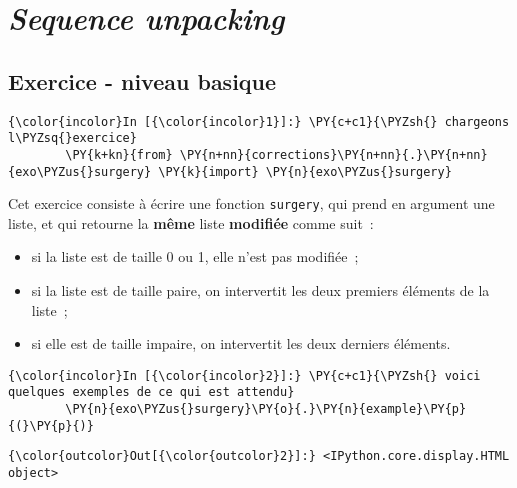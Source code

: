     
    
    
    

    

    \hypertarget{sequence-unpacking}{%
\section{\texorpdfstring{\emph{Sequence
unpacking}}{Sequence unpacking}}\label{sequence-unpacking}}

    \hypertarget{exercice---niveau-basique}{%
\subsection{Exercice - niveau basique}\label{exercice---niveau-basique}}

    \begin{Verbatim}[commandchars=\\\{\}]
{\color{incolor}In [{\color{incolor}1}]:} \PY{c+c1}{\PYZsh{} chargeons l\PYZsq{}exercice}
        \PY{k+kn}{from} \PY{n+nn}{corrections}\PY{n+nn}{.}\PY{n+nn}{exo\PYZus{}surgery} \PY{k}{import} \PY{n}{exo\PYZus{}surgery}
\end{Verbatim}


    Cet exercice consiste à écrire une fonction \texttt{surgery}, qui prend
en argument une liste, et qui retourne la \textbf{même} liste
\textbf{modifiée} comme suit~:

\begin{itemize}
\tightlist
\item
  si la liste est de taille 0 ou 1, elle n'est pas modifiée~;
\item
  si la liste est de taille paire, on intervertit les deux premiers
  éléments de la liste~;
\item
  si elle est de taille impaire, on intervertit les deux derniers
  éléments.
\end{itemize}

    \begin{Verbatim}[commandchars=\\\{\}]
{\color{incolor}In [{\color{incolor}2}]:} \PY{c+c1}{\PYZsh{} voici quelques exemples de ce qui est attendu}
        \PY{n}{exo\PYZus{}surgery}\PY{o}{.}\PY{n}{example}\PY{p}{(}\PY{p}{)}
\end{Verbatim}


\begin{Verbatim}[commandchars=\\\{\}]
{\color{outcolor}Out[{\color{outcolor}2}]:} <IPython.core.display.HTML object>
\end{Verbatim}
            
